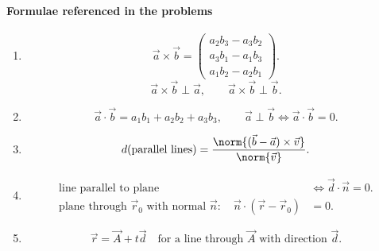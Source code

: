 \paragraph*{Formulae referenced in the problems}\par
\begin{enumerate}[label=\theenumi,leftmargin=4mm,itemsep=4pt]
\setcounter{enumi}{0}\item

\begin{equation}
\vec a\times\vec b=
\begin{pmatrix}
a_2b_3-a_3b_2\\
a_3b_1-a_1b_3\\
a_1b_2-a_2b_1
\end{pmatrix}.
\label{eq:cross-product}
\end{equation}
\begin{equation}
\vec a\times\vec b\perp\vec a,\qquad
\vec a\times\vec b\perp\vec b.
\label{eq:cross-perpendicular}
\end{equation}

\setcounter{enumi}{4}\item

\begin{equation}
\vec a\cdot\vec b=a_1b_1+a_2b_2+a_3b_3,\qquad
\vec a\perp\vec b\iff\vec a\cdot\vec b=0.
\label{eq:dot-product}
\end{equation}

\setcounter{enumi}{5}\item

\begin{equation}
d(\text{parallel lines})=
\frac{\norm{(\vec b-\vec a)\times\vec v}}{\norm{\vec v}}.
\label{eq:parallel-distance}
\end{equation}

\setcounter{enumi}{9}\item

\begin{align}
\text{line parallel to plane}&\iff \vec d\cdot\vec n=0.
\label{eq:line-plane-parallel}\\
\text{plane through }\vec r_0\text{ with normal }\vec n:\quad
\vec n\cdot(\vec r-\vec r_0)&=0.
\label{eq:plane-normal}
\end{align}

\setcounter{enumi}{14}\item

\begin{equation}
\vec r=\vec A+t\vec d
\quad\text{for a line through }\vec A\text{ with direction }\vec d.
\label{eq:line-point-direction}
\end{equation}


\end{enumerate}
